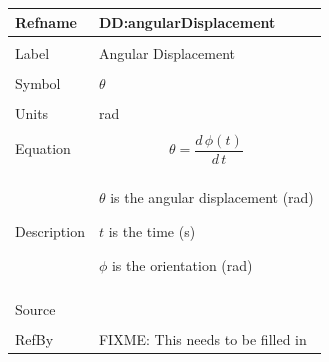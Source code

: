 \documentclass[12pt]{article}
\begin{document}
\noindent \begin{minipage}{\textwidth}
\begin{tabular}{p{} p{}}
\toprule \textbf{Refname} & \textbf{DD:angularDisplacement}
\label{DD:angularDisplacement}
\\ \midrule \\
Label & Angular Displacement
\\ \midrule \\
Symbol & $θ$
\\ \midrule \\
Units & rad
\\ \midrule \\
Equation & \begin{dmath}
           θ=\frac{d\,ϕ\left(t\right)}{d\,t}
           \end{dmath}
\\ \midrule \\
Description & \begin{symbDescription}
              \item{$θ$ is the angular displacement (rad)}
              \item{$t$ is the time (s)}
              \item{$ϕ$ is the orientation (rad)}
              \end{symbDescription}
\\ \midrule \\
Source & 
\\ \midrule \\
RefBy & FIXME: This needs to be filled in
\\ \bottomrule \end{tabular}
\end{minipage}\\
~\newline
\end{document}

